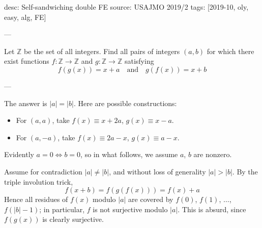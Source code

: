 desc: Self-sandwiching double FE
source: USAJMO 2019/2
tags: [2019-10, oly, easy, alg, FE]

---

Let $\mathbb Z$ be the set of all integers. Find all pairs of integers $(a,b)$ for which there exist functions $f:\mathbb Z\to\mathbb Z$ and $g:\mathbb Z\to\mathbb Z$ satisfying \[f(g(x))=x+a\quad\text{and}\quad g(f(x))=x+b\]

---

The answer is $|a|=|b|$. Here are possible constructions:
\begin{itemize}[itemsep=0em]
    \item For $(a,a)$, take $f(x)\equiv x+2a$, $g(x)\equiv x-a$.
    \item For $(a,-a)$, take $f(x)\equiv2a-x$, $g(x)\equiv a-x$.
\end{itemize}
Evidently $a=0\iff b=0$, so in what follows, we assume $a$, $b$ are nonzero.

Assume for contradiction $|a|\ne|b|$, and without loss of generality $|a|>|b|$. By the triple involution trick, \[f(x+b)=f(g(f(x)))=f(x)+a\]
Hence all residues of $f(x)$ modulo $|a|$ are covered by $f(0)$, $f(1)$, $\ldots$, $f(|b|-1)$; in particular, $f$ is not surjective modulo $|a|$. This is absurd, since $f(g(x))$ is clearly surjective.

